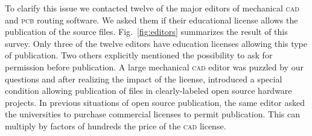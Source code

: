 \documentclass[letterpaper, 10 pt, conference]{ieeeconf}  %
\begin{document}

To clarify this issue we contacted twelve of the major editors of mechanical \textsc{cad} and \textsc{pcb} routing software.
We asked them if their educational license allows the publication of the source files. %
Fig.~\ref{fig:editors} summarizes the result of this survey.
Only three of the twelve editors have education licenses allowing this type of publication. 
Two others explicitly mentioned the possibility to ask for permission before publication.
A large mechanical \textsc{cad} editor was puzzled by our questions and after realizing the impact of the license, introduced a special condition allowing publication of files in clearly-labeled open source hardware projects.
In previous situations of open source publication, the same editor asked the universities to purchase commercial licenses to permit publication.
This can multiply by factors of hundreds the price of the \textsc{cad} license.
\end{document}
